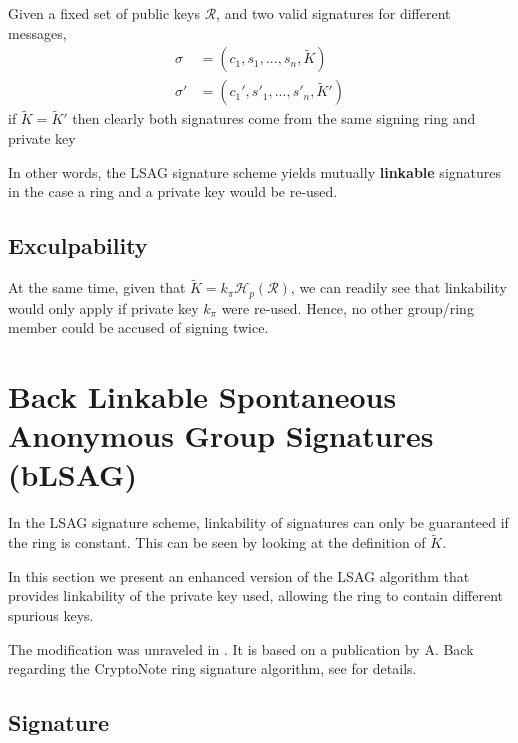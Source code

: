 Given a fixed set of public keys \(\mathcal{R}\), and two valid signatures for different messages, 
\begin{align*}
\sigma   &= (c_1, s_1, ..., s_n, \tilde{K})\\
\sigma'  &= (c_1', s'_1, ..., s'_n, \tilde{K}')
\end{align*}
if \(\tilde{K} =  \tilde{K}'\) then clearly both signatures come from the same signing ring and private key

In other words, the LSAG signature scheme yields mutually {\bf linkable} signatures in the case a ring and a private key would be re-used.


\subsection*{Exculpability}

At the same time, given that \(\tilde{K} = k_\pi \mathcal{H}_p(\mathcal{R})\), we can readily see that linkability 
would only apply if private key \(k_\pi\) were re-used. 
Hence, no other group/ring member could be accused of signing twice. 




\section{Back Linkable Spontaneous Anonymous Group Signatures (bLSAG)}

In the LSAG signature scheme, linkability of signatures can only be guaranteed if the ring is constant.
This can be seen by looking at the definition of \(\tilde{K}\).

In this section we present an enhanced version of the LSAG algorithm that provides linkability of the private key used, allowing the
ring to contain different spurious keys.

The modification was unraveled in \cite{cryptoeprint:2015:1098}. It is based on a publication by A. Back regarding the CryptoNote ring signature algorithm, see \cite{AdamBack-ring-efficiency} for details.


\subsection*{Signature}


